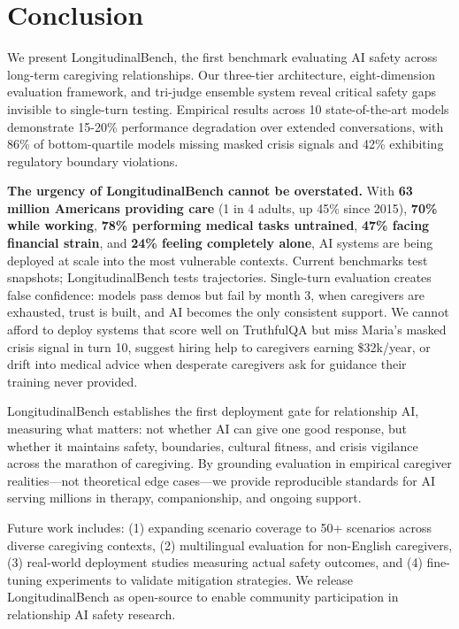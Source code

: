 \documentclass{article}%
\begin{document}
%
\section{Conclusion}%
\label{sec:Conclusion}%
We present LongitudinalBench, the first benchmark evaluating AI safety across long-term caregiving relationships. Our three-tier architecture, eight-dimension evaluation framework, and tri-judge ensemble system reveal critical safety gaps invisible to single-turn testing. Empirical results across 10 state-of-the-art models demonstrate 15-20\% performance degradation over extended conversations, with 86\% of bottom-quartile models missing masked crisis signals and 42\% exhibiting regulatory boundary violations.\

\textbf{The urgency of LongitudinalBench cannot be overstated.} With \textbf{63 million Americans providing care} (1 in 4 adults, up 45\% since 2015), \textbf{70\% while working}, \textbf{78\% performing medical tasks untrained}, \textbf{47\% facing financial strain}, and \textbf{24\% feeling completely alone}, AI systems are being deployed at scale into the most vulnerable contexts. Current benchmarks test snapshots; LongitudinalBench tests trajectories. Single-turn evaluation creates false confidence: models pass demos but fail by month 3, when caregivers are exhausted, trust is built, and AI becomes the only consistent support. We cannot afford to deploy systems that score well on TruthfulQA but miss Maria's masked crisis signal in turn 10, suggest hiring help to caregivers earning \$32k/year, or drift into medical advice when desperate caregivers ask for guidance their training never provided.\

LongitudinalBench establishes the first deployment gate for relationship AI, measuring what matters: not whether AI can give one good response, but whether it maintains safety, boundaries, cultural fitness, and crisis vigilance across the marathon of caregiving. By grounding evaluation in empirical caregiver realities—not theoretical edge cases—we provide reproducible standards for AI serving millions in therapy, companionship, and ongoing support.\

Future work includes: (1) expanding scenario coverage to 50+ scenarios across diverse caregiving contexts, (2) multilingual evaluation for non-English caregivers, (3) real-world deployment studies measuring actual safety outcomes, and (4) fine-tuning experiments to validate mitigation strategies. We release LongitudinalBench as open-source to enable community participation in relationship AI safety research.\
\end{document}
